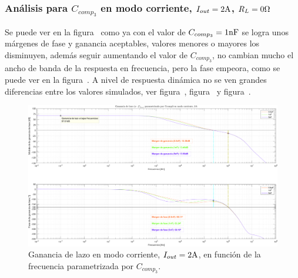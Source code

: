 \subsubsection{Análisis para $C_{comp_{3}}$ en modo corriente, $I_{out} = 2 \si[per-mode=symbol]{\ampere}$, $R_{L} = 0 \si[per-mode=symbol]{\ohm}$}

Se puede ver en la figura~ como ya con el valor de $C_{comp_{3}} = 1 \si[per-mode=symbol]{\nano\farad}$ se logra unos márgenes de fase y ganancia aceptables, valores menores o mayores los disminuyen, además seguir aumentando el valor de $C_{comp_{3}}$, no cambian mucho el ancho de banda de la respuesta en frecuencia, pero la fase empeora, como se puede ver en la figura~. A nivel de respuesta dinámica no se ven grandes diferencias entre los valores simulados, ver figura~, figura~ y figura~.

\vfill



\clearpage

\begin{figure}[H] %
\begin{center}
\includegraphics[width=1.1 \textwidth, angle=90]{./img/plots/loop/power_supply_CCOMP3_LOOP_Modo3.png}
\caption{\label{fig:fig_power_supply_CCOMP3_LOOP_Modo3}\footnotesize{Ganancia de lazo en modo corriente, $I_{out} = 2 \si[per-mode=symbol]{\ampere}$, en función de la frecuencia parametrizada por $C_{comp_{3}}$.}}
\end{center}
\end{figure}


\clearpage

